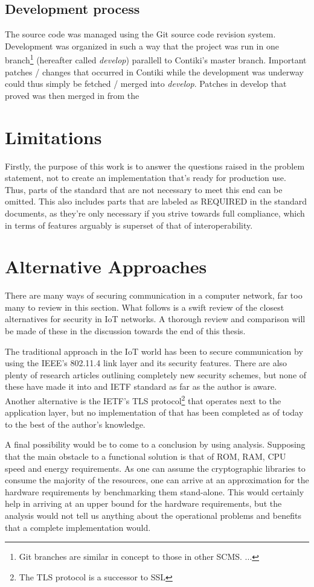 \documentclass[final,letterpaper,twoside,12pt,twocolumn]{report}
\begin{document}
\subsection{Development process}
The source code was managed using the Git source code revision system. Development was organized in such a way that the project was run in one branch\footnote{Git branches are similar in concept to those in other SCMS. ...} (hereafter called \emph{develop}) parallell to Contiki's master branch. Important patches / changes that occurred in Contiki while the development was underway could thus simply be fetched / merged into \emph{develop}. Patches in develop that proved  was then merged in from the 

\section{Limitations}
Firstly, the purpose of this work is to answer the questions raised in the problem statement, not to create an implementation that's ready for production use. Thus, parts of the standard that are not necessary to meet this end can be omitted. This also includes parts that are labeled as REQUIRED in the standard documents, as they're only necessary if you strive towards full compliance, which in terms of features arguably is superset of that of interoperability.

\section{Alternative Approaches}
There are many ways of securing communication in a computer network, far too many to review in this section. What follows is a swift review of the closest alternatives for security in IoT networks. A thorough review and comparison will be made of these in the discussion towards the end of this thesis.

The traditional approach in the IoT world has been to secure communication by using the IEEE's 802.11.4 link layer and its security features. There are also plenty of research articles outlining completely new security schemes, but none of these have made it into and IETF standard as far as the author is aware. Another alternative is the IETF's TLS protocol\footnote{The TLS protocol is a successor to SSL} that operates next to the application layer, but no implementation of that has been completed as of today to the best of the author's knowledge.

A final possibility would be to come to a conclusion by using analysis. Supposing that the main obstacle to a functional solution is that of ROM, RAM, CPU speed and energy requirements. As one can assume the cryptographic libraries to consume the majority of the resources, one can arrive at an approximation for the hardware requirements by benchmarking them stand-alone. This would certainly help in arriving at an upper bound for the hardware requirements, but the analysis would not tell us anything about the operational problems and benefits that a complete implementation would.
\end{document}
